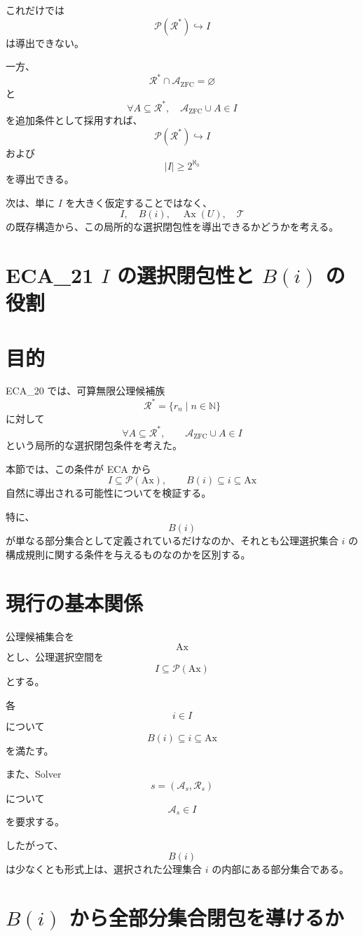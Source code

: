 \documentclass[a4paper,11pt]{article}
\newcommand{\Ax}{\mathrm{Ax}}
\begin{document}
これだけでは
\[
\mathcal{P}(\mathcal{R}^*)\hookrightarrow I
\]
は導出できない。

一方、
\[
\mathcal{R}^*\cap\mathcal{A}_{\mathrm{ZFC}}=\varnothing
\]
と
\[
\forall A\subseteq\mathcal{R}^*,
\quad
\mathcal{A}_{\mathrm{ZFC}}\cup A\in I
\]
を追加条件として採用すれば、
\[
\mathcal{P}(\mathcal{R}^*)\hookrightarrow I
\]
および
\[
|I|\ge2^{\aleph_0}
\]
を導出できる。

次は、単に $I$ を大きく仮定することではなく、
\[
I,\quad B(i),\quad\operatorname{Ax}(U),\quad\mathcal{T}
\]
の既存構造から、この局所的な選択閉包性を導出できるかどうかを考える。

\section{ECA_21 $I$ の選択閉包性と $B(i)$ の役割}

\section{目的}

ECA_20 では、可算無限公理候補族
\[
\mathcal{R}^*=\{r_n\mid n\in\mathbb{N}\}
\]
に対して
\[
\forall A\subseteq\mathcal{R}^*,
\qquad
\mathcal{A}_{\mathrm{ZFC}}\cup A\in I
\]
という局所的な選択閉包条件を考えた。

本節では、この条件が ECA から
\[
I\subseteq\mathcal{P}(\Ax),
\qquad
B(i)\subseteq i\subseteq\Ax
\]
自然に導出される可能性についてを検証する。

特に、
\[
B(i)
\]
が単なる部分集合として定義されているだけなのか、それとも公理選択集合 $i$ の構成規則に関する条件を与えるものなのかを区別する。

\section{現行の基本関係}

公理候補集合を
\[
\Ax
\]
とし、公理選択空間を
\[
I\subseteq\mathcal{P}(\Ax)
\]
とする。

各
\[
i\in I
\]
について
\[
B(i)\subseteq i\subseteq\Ax
\]
を満たす。

また、Solver
\[
s=(\mathcal{A}_s,\mathcal{R}_s)
\]
について
\[
\mathcal{A}_s\in I
\]
を要求する。

したがって、
\[
B(i)
\]
は少なくとも形式上は、選択された公理集合 $i$ の内部にある部分集合である。

\section{$B(i)$ から全部分集合閉包を導けるか}
\end{document}
